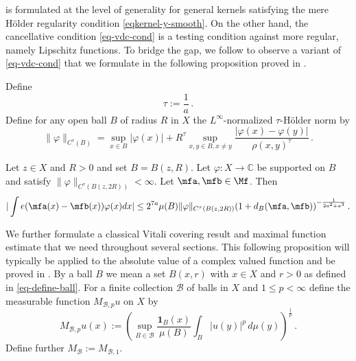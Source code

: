  is formulated at the level of generality
for general kernels satisfying the mere H\"older regularity condition \eqref{eqkernel-y-smooth}. On the other hand, the cancellative condition \eqref{eq-vdc-cond} is a testing condition against more regular,
namely Lipschitz functions. To bridge the gap, we follow \cite{zk-polynomial} to observe a variant of \eqref{eq-vdc-cond} that we formulate
in the following proposition proved in .


Define
\begin{equation}
    \tau:=\frac 1a\, .
\end{equation}
Define for any open ball $B$ of radius $R$ in $X$ the $L^\infty$-normalized $\tau$-H\"older norm by
\begin{equation}
    \label{eq-Holder-norm}
    \|\varphi\|_{C^\tau(B)} = \sup_{x \in B} |\varphi(x)| + R^\tau \sup_{x,y \in B, x \neq y} \frac{|\varphi(x) - \varphi(y)|}{\rho(x,y)^\tau}\,.
\end{equation}


\begin{proposition}
    \label{Holder-van-der-Corput}
    \leanok
     Let $z\in X$ and $R>0$ and set $B=B(z,R)$.
     Let $\varphi: X \to \mathbb{C}$ be
     supported on $B$ and satisfy $\|{\varphi}\|_{C^\tau(B(z, 2R))}<\infty$.
     Let $\mfa, \mfb \in \Mf$. Then
    \begin{equation}
        \label{eq-vdc-cond-tau-2}
        |\int e(\mfa(x)-{\mfb(x)})\varphi(x) dx|\le
         2^{7a} \mu(B) \|{\varphi}\|_{C^\tau(B(z, 2R))}
       (1 + d_{B}(\mfa,\mfb))^{-\frac{1}{2a^2+a^3}}
    \,.
    \end{equation}
\end{proposition}

We further formulate a classical Vitali covering result
and maximal function estimate that we need throughout several sections.
This following proposition will typically be applied to the absolute value of a complex valued function and be proved in . By a ball $B$ we mean a set $B(x,r)$ with $x\in X$
and $r>0$ as defined in \eqref{eq-define-ball}.
For a finite collection $\mathcal{B}$ of balls in $X$
and $1\le p< \infty$ define the measurable function $M_{\mathcal{B},p}u$ on $X$ by
\begin{equation}\label{def-hlm}
    M_{\mathcal{B},p}u(x):=\left(\sup_{B\in \mathcal{B}} \frac{\mathbf{1}_{B}(x)}{\mu(B)}\int _{B} |u(y)|^p\, d\mu(y)\right)^\frac 1p\, .
\end{equation}
Define further $M_{\mathcal{B}}:=M_{\mathcal{B},1}$.

